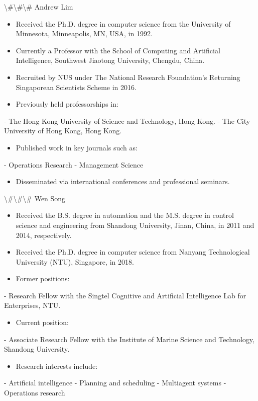 \documentclass{article}
\begin{document}
	\textbackslash{}#\textbackslash{}#\textbackslash{}# Andrew Lim
	
	\begin{itemize}
		\item Received the Ph.D. degree in computer science from the University of Minnesota, Minneapolis, MN, USA, in 1992.
		\item Currently a Professor with the School of Computing and Artificial Intelligence, Southwest Jiaotong University, Chengdu, China.
		\item Recruited by NUS under The National Research Foundation’s Returning Singaporean Scientists Scheme in 2016.
		\item Previously held professorships in:
	\end{itemize}
	- The Hong Kong University of Science and Technology, Hong Kong.
	- The City University of Hong Kong, Hong Kong.
	\begin{itemize}
		\item Published work in key journals such as:
	\end{itemize}
	- Operations Research
	- Management Science
	\begin{itemize}
		\item Disseminated via international conferences and professional seminars.
	\end{itemize}
	
	\textbackslash{}#\textbackslash{}#\textbackslash{}# Wen Song
	
	\begin{itemize}
		\item Received the B.S. degree in automation and the M.S. degree in control science and engineering from Shandong University, Jinan, China, in 2011 and 2014, respectively.
		\item Received the Ph.D. degree in computer science from Nanyang Technological University (NTU), Singapore, in 2018.
		\item Former positions:
	\end{itemize}
	- Research Fellow with the Singtel Cognitive and Artificial Intelligence Lab for Enterprises, NTU.
	\begin{itemize}
		\item Current position:
	\end{itemize}
	- Associate Research Fellow with the Institute of Marine Science and Technology, Shandong University.
	\begin{itemize}
		\item Research interests include:
	\end{itemize}
	- Artificial intelligence
	- Planning and scheduling
	- Multiagent systems
	- Operations research
	
\end{document}
